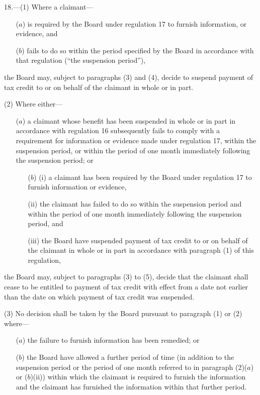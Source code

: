\documentclass[12pt,a4paper]{article}
\begin{document}
18.---(1)  Where a claimant—
\begin{enumerate}\item[]
($a$) is required by the Board under regulation 17 to furnish information, or evidence, and

($b$) fails to do so within the period specified by the Board in accordance with that regulation (“the suspension period”),
\end{enumerate}
the Board may, subject to paragraphs (3) and (4), decide to suspend payment of tax credit to or on behalf of the claimant in whole or in part.

(2) Where either—
\begin{enumerate}\item[]
($a$) a claimant whose benefit has been suspended in whole or in part in accordance with regulation 16 subsequently fails to comply with a requirement for information or evidence made under regulation 17, within the suspension period, or within the period of one month immediately following the suspension period; or

\begin{enumerate}\item[($b$)] (i) a claimant has been required by the Board under regulation 17 to furnish information or evidence,

(ii) the claimant has failed to do so within the suspension period and within the period of one month immediately following the suspension period, and

(iii) the Board have suspended payment of tax credit to or on behalf of the claimant in whole or in part in accordance with paragraph (1) of this regulation,
\end{enumerate}
\end{enumerate}
the Board may, subject to paragraphs (3) to (5), decide that the claimant shall cease to be entitled to payment of tax credit with effect from a date not earlier than the date on which payment of tax credit was suspended.

(3) No decision shall be taken by the Board pursuant to paragraph (1) or (2) where—
\begin{enumerate}\item[]
($a$) the failure to furnish information has been remedied; or

($b$) the Board have allowed a further period of time (in addition to the suspension period or the period of one month referred to in paragraph (2)($a$)  or ($b$)(ii)) within which the claimant is required \pagebreak[3] to furnish the information and the claimant has furnished the information within that further period.
\end{enumerate}
\end{document}
